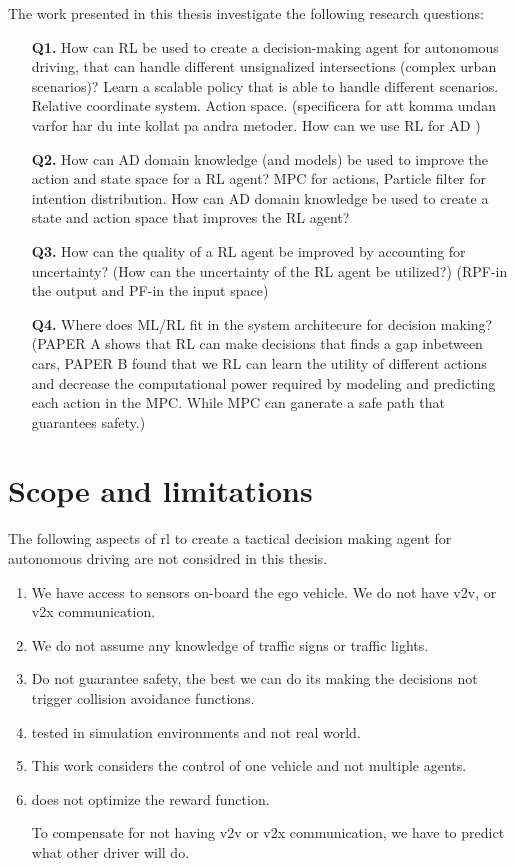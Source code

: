 The work presented in this thesis investigate the following research questions:
\begin{enumerate}
	\item[\textbf{Q1.}] How can RL be used to create a decision-making agent for autonomous driving, that can handle different unsignalized intersections (complex urban scenarios)? Learn a scalable policy that is able to handle different scenarios. Relative coordinate system. Action space. 
	(specificera for att komma undan varfor har du inte kollat pa andra metoder. How can we use RL for AD )
	\item[\textbf{Q2.}] How can AD domain knowledge (and models) be used to improve the action and state space for a RL agent? MPC for actions, Particle filter for intention distribution. How can AD domain knowledge be used to create a state and action space that improves the RL agent?
	\item[\textbf{Q3.}] How can the quality of a RL agent be improved by accounting for uncertainty?
	(How can the uncertainty of the RL agent be utilized?) (RPF-in the output and PF-in the input space)

	\item[\textbf{Q4.}] Where does ML/RL fit in the system architecure for decision making?
	(PAPER A shows that RL can make decisions that finds a gap inbetween cars, PAPER B found that we RL can learn the utility of different actions and decrease the computational power required by modeling and predicting each action in the MPC. While MPC can ganerate a safe path that guarantees safety.) 
\end{enumerate}



\section{Scope and limitations}
The following aspects of \gls{rl} to create a tactical decision making agent for autonomous driving are not considred in this thesis. 

\begin{enumerate}
	\item We have access to sensors on-board the ego vehicle. We do not have v2v, or v2x communication. 
	\item We do not assume any knowledge of traffic signs or traffic lights. 
	\item Do not guarantee safety, the best we can do its making the decisions not trigger collision avoidance functions. 
	\item tested in simulation environments and not real world. 
	\item This work considers the control of one vehicle and not multiple agents. 
	\item does not optimize the reward function. 
	
	To compensate for not having v2v or v2x communication, we have to predict what other driver will do. 
	
\end{enumerate}


